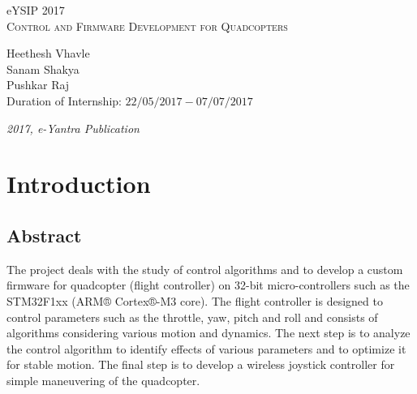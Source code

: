 \documentclass[a4paper,12pt,oneside]{book}
\begin{document}
\begin{titlepage}
\raggedright
{\Large eYSIP 2017\\[1cm]}
{\Huge \scshape Control and Firmware Development for Quadcopters \\[.1in]}
\vfill
\begin{flushright}
{\large Heethesh Vhavle \\}
{\large Sanam Shakya \\}
{\large Pushkar Raj \\}
\vspace{0.5cm}
{\large Duration of Internship: $ 22/05/2017-07/07/2017 $ \\}
\end{flushright}
\medskip

{\itshape 2017, e-Yantra Publication}
\end{titlepage}


\tableofcontents
\listoffigures


\chapter[Introduction]{Introduction}
\section{Abstract}
The project deals with the study of control algorithms and to develop a custom firmware for quadcopter (flight controller) on 32-bit micro-controllers such as the STM32F1xx (ARM® Cortex®-M3 core). The flight controller is designed to control parameters such as the throttle, yaw, pitch and roll and consists of algorithms considering various motion and dynamics. The next step is to analyze the control algorithm to identify effects of various parameters and to optimize it for stable motion. The final step is to develop a wireless joystick controller for simple maneuvering of the quadcopter. 
\end{document}
